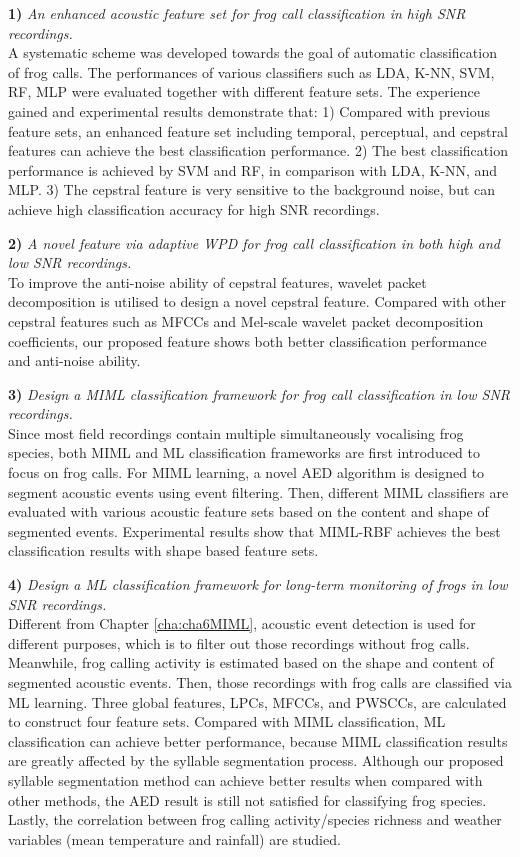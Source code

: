 \textbf{1)} \textit{An enhanced acoustic feature set for frog call classification in high SNR recordings.} 
\\
A systematic scheme was developed towards the goal of automatic classification of frog calls. The performances of various classifiers such as LDA, K-NN, SVM, RF, MLP were evaluated together with different feature sets. The experience gained and experimental results demonstrate that: 1) Compared with previous feature sets, an enhanced feature set including temporal, perceptual, and cepstral features can achieve the best classification performance. 2) The best classification performance is achieved by SVM and RF, in comparison with LDA, K-NN, and MLP. 3) The cepstral feature is very sensitive to the background noise, but can achieve high classification accuracy for high SNR recordings. 

\textbf{2)} \textit{A novel feature via adaptive WPD for frog call classification in both high and low SNR recordings.}
\\
To improve the anti-noise ability of cepstral features, wavelet packet decomposition is utilised to design a novel cepstral feature. Compared with other cepstral features such as MFCCs and Mel-scale wavelet packet decomposition coefficients, our proposed feature shows both better classification performance and anti-noise ability. 



\textbf{3)}  \textit{Design a MIML classification framework for frog call classification in low SNR recordings.} 
\\
Since most field recordings contain multiple simultaneously vocalising frog species, both MIML and ML classification frameworks are first introduced to focus on frog calls. For MIML learning, a novel AED algorithm is designed to segment acoustic events using event filtering. Then, different MIML classifiers are evaluated with various acoustic feature sets based on the content and shape of segmented events. Experimental results show that MIML-RBF achieves the best classification results with shape based feature sets. 


\textbf{4)}  \textit{Design a ML classification framework for long-term monitoring of frogs in low SNR recordings.} 
\\
Different from Chapter \ref{cha:cha6MIML}, acoustic event detection is used for different purposes, which is to filter out those recordings without frog calls. Meanwhile, frog calling activity is estimated based on the shape and content of segmented acoustic events. Then, those recordings with frog calls are classified via ML learning. Three global features, LPCs, MFCCs, and PWSCCs, are calculated to construct four feature sets. Compared with MIML classification, ML classification can achieve better performance, because MIML classification results are greatly affected by the syllable segmentation process. Although our proposed syllable segmentation method can achieve better results when compared with 
other methods, the AED result is still not satisfied for classifying frog species. Lastly, the correlation between frog calling activity/species richness and weather variables (mean temperature and rainfall) are studied.

